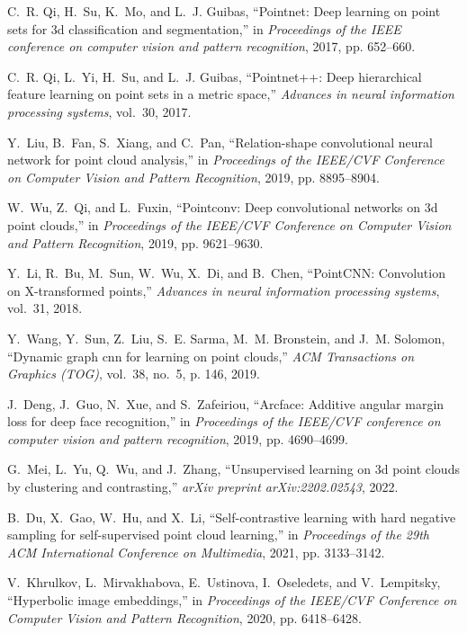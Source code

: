 \documentclass{article}
\begin{document}
\begin{thebibliography}{10}
C.~R. Qi, H.~Su, K.~Mo, and L.~J. Guibas, ``Pointnet: Deep learning on point
  sets for 3d classification and segmentation,'' in \emph{Proceedings of the
  IEEE conference on computer vision and pattern recognition}, 2017, pp.
  652--660.

C.~R. Qi, L.~Yi, H.~Su, and L.~J. Guibas, ``Pointnet++: Deep hierarchical
  feature learning on point sets in a metric space,'' \emph{Advances in neural
  information processing systems}, vol.~30, 2017.

Y.~Liu, B.~Fan, S.~Xiang, and C.~Pan, ``Relation-shape convolutional neural
  network for point cloud analysis,'' in \emph{Proceedings of the IEEE/CVF
  Conference on Computer Vision and Pattern Recognition}, 2019, pp. 8895--8904.

W.~Wu, Z.~Qi, and L.~Fuxin, ``Pointconv: Deep convolutional networks on 3d
  point clouds,'' in \emph{Proceedings of the IEEE/CVF Conference on Computer
  Vision and Pattern Recognition}, 2019, pp. 9621--9630.

Y.~Li, R.~Bu, M.~Sun, W.~Wu, X.~Di, and B.~Chen, ``{PointCNN: Convolution on
  X-transformed points},'' \emph{Advances in neural information processing
  systems}, vol.~31, 2018.

Y.~Wang, Y.~Sun, Z.~Liu, S.~E. Sarma, M.~M. Bronstein, and J.~M. Solomon,
  ``Dynamic graph cnn for learning on point clouds,'' \emph{ACM Transactions on
  Graphics (TOG)}, vol.~38, no.~5, p. 146, 2019.

J.~Deng, J.~Guo, N.~Xue, and S.~Zafeiriou, ``Arcface: Additive angular margin
  loss for deep face recognition,'' in \emph{Proceedings of the IEEE/CVF
  conference on computer vision and pattern recognition}, 2019, pp. 4690--4699.

G.~Mei, L.~Yu, Q.~Wu, and J.~Zhang, ``Unsupervised learning on 3d point clouds
  by clustering and contrasting,'' \emph{arXiv preprint arXiv:2202.02543},
  2022.

B.~Du, X.~Gao, W.~Hu, and X.~Li, ``Self-contrastive learning with hard negative
  sampling for self-supervised point cloud learning,'' in \emph{Proceedings of
  the 29th ACM International Conference on Multimedia}, 2021, pp. 3133--3142.

V.~Khrulkov, L.~Mirvakhabova, E.~Ustinova, I.~Oseledets, and V.~Lempitsky,
  ``Hyperbolic image embeddings,'' in \emph{Proceedings of the IEEE/CVF
  Conference on Computer Vision and Pattern Recognition}, 2020, pp. 6418--6428.


\end{thebibliography}
\end{document}

